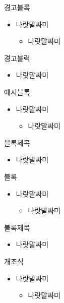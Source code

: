 \documentclass[aspectratio=169,xcolor=dvipsnames,presentation]{beamer}
\begin{document}
\begin{frame}{경고블록}
    \begin{itemize}[<+->]
        \item 나랏말싸미
        \begin{itemize}[<+->]
            \item 나랏말싸미
        \end{itemize}
    \end{itemize}
    \begin{alertblock}{경고블럭}
        \begin{itemize}[<+->]
            \item 나랏말싸미
        \end{itemize}
    \end{alertblock}
\end{frame}

\begin{frame}{예시블록}
    \begin{itemize}[<+->]
        \item 나랏말싸미
        \begin{itemize}[<+->]
            \item 나랏말싸미
        \end{itemize}
    \end{itemize}
    \begin{exampleblock}{블록제목}
        \begin{itemize}[<+->]
            \item 나랏말싸미
        \end{itemize}
    \end{exampleblock}
\end{frame}

\begin{frame}{블록}
    \begin{itemize}[<+->]
        \item 나랏말싸미
        \begin{itemize}[<+->]
            \item 나랏말싸미
        \end{itemize}
    \end{itemize}
    \begin{block}{블록제목}
        \begin{itemize}[<+->]
            \item 나랏말싸미
        \end{itemize}
    \end{block}
\end{frame}

\begin{frame}{개조식}
    \begin{itemize}[<+->]
        \item 나랏말싸미
        \begin{itemize}[<+->]
            \item 나랏말싸미
        \end{itemize}
    \end{itemize}
\end{frame}

\end{document}
